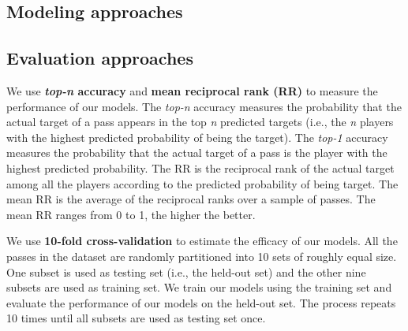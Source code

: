 \subsection{Modeling approaches}



\subsection{Evaluation approaches}

We use \textbf{\textit{top-n} accuracy} and \textbf{mean reciprocal rank (RR)} to measure the performance of our models.
The \textit{top-n} accuracy measures the probability that the actual target of a pass appears in the top \textit{n} predicted targets (i.e., the \textit{n} players with the highest predicted probability of being the target).
The \textit{top-1} accuracy measures the probability that the actual target of a pass is the player with the highest predicted probability.
The RR is the reciprocal rank of the actual target among all the players according to the predicted probability of being target.
The mean RR is the average of the reciprocal ranks over a sample of passes. The mean RR ranges from 0 to 1, the higher the better.
 
We use \textbf{10-fold cross-validation} to estimate the efficacy of our models. All the passes in the dataset are randomly partitioned into 10 sets of roughly equal size. One subset is used as testing set (i.e., the held-out set) and the other nine subsets are used as training set. 
We train our models using the training set and evaluate the performance of our models on the held-out set.
The process repeats 10 times until all subsets are used as testing set once.
